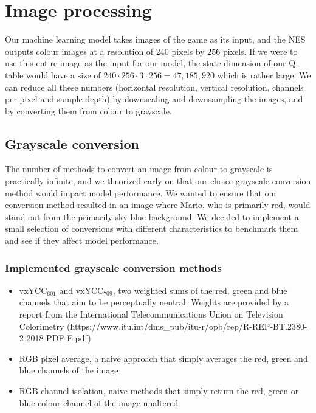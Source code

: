 \section{Image processing}

Our machine learning model takes images of the game as its input, and the NES outputs colour images at a resolution of 240 pixels by 256 pixels. If we were to use this entire image as the input for our model, the state dimension of our Q-table would have a size of $240 \cdot 256 \cdot 3 \cdot 256 = 47,185,920$ which is rather large. We can reduce all these numbers (horizontal resolution, vertical resolution, channels per pixel and sample depth) by downscaling and downsampling the images, and by converting them from colour to grayscale.

\subsection{Grayscale conversion}

The number of methods to convert an image from colour to grayscale is practically infinite, and we theorized early on that our choice grayscale conversion method would impact model performance. We wanted to ensure that our conversion method resulted in an image where Mario, who is primarily red, would stand out from the primarily sky blue background. We decided to implement a small selection of conversions with different characteristics to benchmark them and see if they affect model performance.

\subsubsection*{Implemented grayscale conversion methods}

\begin{itemize}
    \item vxYCC$_{601}$ and vxYCC$_{709}$, two weighted sums of the red, green and blue channels that aim to be perceptually neutral. Weights are provided by a report from the International Telecommunications Union on Television Colorimetry (https://www.itu.int/dms\_pub/itu-r/opb/rep/R-REP-BT.2380-2-2018-PDF-E.pdf)
    \item RGB pixel average, a naive approach that simply averages the red, green and blue channels of the image
    \item RGB channel isolation, naive methods that simply return the red, green or blue colour channel of the image unaltered
\end{itemize}


